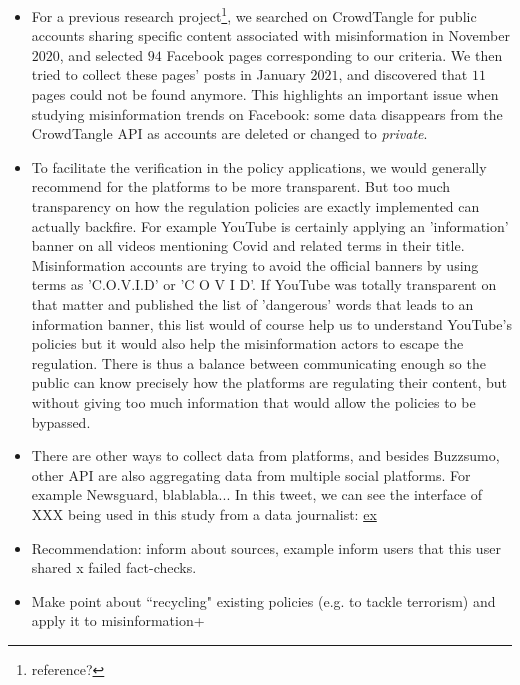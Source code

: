 \documentclass{article}
\begin{document}
{ \color{pink} 

\begin{itemize}

	\item For a previous research project\footnote{reference?}, we searched on CrowdTangle for public accounts sharing specific content associated with misinformation in November $2020$, and selected $94$ Facebook pages corresponding to our criteria. We then tried to collect these pages' posts in January $2021$, and discovered that $11$ pages could not be found anymore. This highlights an important issue when studying misinformation trends on Facebook: some data disappears from the CrowdTangle API as accounts are deleted or changed to {\it private}. 

	\item To facilitate the verification in the policy applications, we would generally recommend for the platforms to be more transparent. But too much transparency on how the regulation policies are exactly implemented can actually backfire. For example YouTube is certainly applying an 'information' banner on all videos mentioning Covid and related terms in their title. Misinformation accounts are trying to avoid the official banners by using terms as 'C.O.V.I.D' or 'C O V I D'. If YouTube was totally transparent on that matter and published the list of 'dangerous' words that leads to an information banner, this list would of course help us to understand YouTube's policies but it would also help the misinformation actors to escape the regulation. There is thus a balance between communicating enough so the public can know precisely how the platforms are regulating their content, but without giving too much information that would allow the policies to be bypassed.

	\item There are other ways to collect data from platforms, and besides Buzzsumo, other API are also aggregating data from multiple social platforms. For example Newsguard, blablabla... In this tweet, we can see the interface of XXX being used in this study from a data journalist: \href{https://twitter.com/Shayan86/status/1394742784683298818/photo/2}{ex}

	\item Recommendation: inform about sources, example inform users that this user shared x failed fact-checks. 

	\item Make point about ``recycling" existing policies (e.g. to tackle terrorism) and apply it to misinformation+


\end{itemize}}
\end{document}
